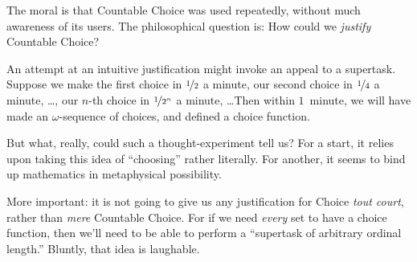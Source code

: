 \documentclass[../../../include/open-logic-section]{subfiles}
\begin{document}
The moral is that Countable Choice was used repeatedly, without much
awareness of its users. The philosophical question is: How could we
\emph{justify} Countable Choice? 

An attempt at an intuitive justification might invoke an appeal to a
supertask. Suppose we make the first choice in $\nicefrac{1}{2}$ a
minute, our second choice in $\nicefrac{1}{4}$ a minute, \dots, our
$n$-th choice in $\nicefrac{1}{2^n}$ a minute, \dots\@ Then within $1$~minute, we will have made an $\omega$-sequence of choices, and defined
a choice function. 

But what, really, could such a thought-experiment tell us? For a
start, it relies upon taking this idea of ``choosing'' rather
literally. For another, it seems to bind up mathematics in
metaphysical possibility. 

More important: it is not going to give us any justification for
Choice \emph{tout court}, rather than \emph{mere} Countable Choice.
For if we need \emph{every} set to have a choice function, then we'll
need to be able to perform a ``supertask of arbitrary ordinal
length.'' Bluntly, that idea is laughable.
\end{document}
